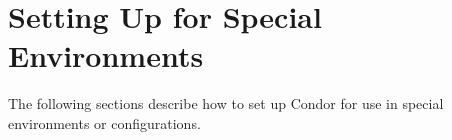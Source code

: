 \section{\label{sec:special-environments}Setting Up for Special
Environments} 

The following sections describe how to set up Condor for use in
special environments or configurations.







%




%



